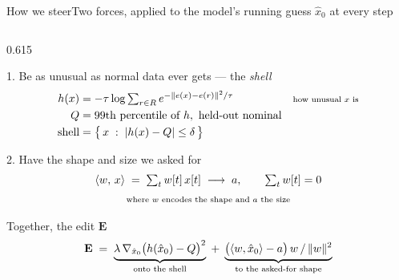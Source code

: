 \documentclass[aspectratio=169,9pt,xcolor=table]{beamer}
\begin{document}
\begin{frame}{How we steer}{Two forces, applied to the model's running guess
  $\hat x_0$ at every step}

  \begin{columns}[T]
    \begin{column}{0.615\textwidth}
      \begin{eqbox}{1. Be as unusual as normal data ever gets --- the \emph{shell}}
        \footnotesize
        \vspace{-0.75em}
        \begin{align*}
          h(x) &= -\tau \log \textstyle\sum_{r \in R}
                  e^{-\lVert e(x) - e(r)\rVert^2/\tau}
                  &&\text{\scriptsize how unusual $x$ is}\\[0em]
          Q &= \text{99th percentile of } h,\ \text{held-out nominal}
                  &&\text{}\\[0em]
          \text{shell} &= \bigl\{\, x \;:\; \lvert h(x) - Q\rvert \le \delta \,\bigr\}
                  &&\text{}
        \end{align*}
        \vspace{-1.6em}
      \end{eqbox}

      \vspace{0.02cm}
      \begin{eqbox}[good]{2. Have the shape and size we asked for}
        \footnotesize
        \vspace{-0.55em}
        \[
          \begin{gathered}
            \langle w,\, x\rangle \;=\; \textstyle\sum_t w[t]\,x[t]
            \;\longrightarrow\; a,
            \qquad \textstyle\sum_t w[t] = 0 \\[0.15em]
            \text{\scriptsize where $w$ encodes the shape and $a$ the size}
          \end{gathered}
        \]
        \vspace{-1.2em}
      \end{eqbox}

      \vspace{0.02cm}
      \begin{eqbox}[ink]{Together, the edit $\mathbf{E}$}
        \footnotesize
        \vspace{-0.9em}
        \[
          \mathbf{E} \;=\;
          \underbrace{\lambda\, \nabla_{\hat x_0}\bigl(h(\hat x_0) - Q\bigr)^2}
                     _{\text{\scriptsize onto the shell}}
          \;+\;
          \underbrace{\bigl(\langle w, \hat x_0\rangle - a\bigr)\, w
                      \,/\, \lVert w \rVert^2}
                     _{\text{\scriptsize to the asked-for shape}}
        \]
        \vspace{-1.12em}
      \end{eqbox}
    \end{column}


\end{columns}
\end{frame}
\end{document}
